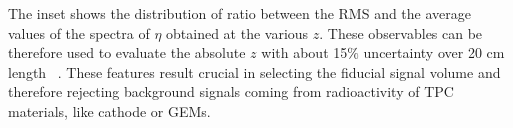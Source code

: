 \documentclass[physics,article,submit,moreauthors,pdftex]{Definitions/mdpi}
\newcommand{\keV}{\ensuremath{\,\textrm{keV}}\xspace}
\newcommand{\eV}{\ensuremath{\,\textrm{eV}}\xspace}
\begin{document}
The inset shows the distribution of ratio between the RMS and the average values of the spectra of $\eta$ obtained at the various $z$. 
These observables can be therefore used to evaluate the absolute $z$ with about 15$\%$ uncertainty over 20 cm length ~\cite{bib:lemon_btf}.
These features result crucial in selecting the fiducial signal volume and therefore rejecting background signals coming from radioactivity of TPC materials, like cathode or GEMs.
%
%
%
\end{document}
